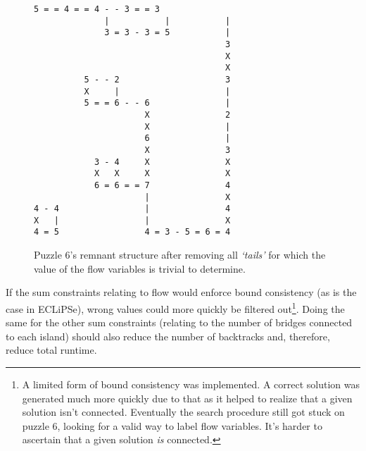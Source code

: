 \begin{figure}[H]
\centering
\begin{BVerbatim}[fontsize=\footnotesize]
              5 = = 4 = = 4 - - 3 = = 3
              |           |           |
              3 = 3 - 3 = 5           |
                                      3
                                      X
                                      X
          5 - - 2                     3
          X     |                     |
          5 = = 6 - - 6               |
                      X               2
                      X               |
                      6               |
                      X               3
            3 - 4     X               X
            X   X     X               X
            6 = 6 = = 7               4
                      |               X
4 - 4                 |               4
X   |                 |               X
4 = 5                 4 = 3 - 5 = 6 = 4
\end{BVerbatim}
\caption{Puzzle 6's remnant structure after removing all \textit{`tails'} for which the value of the flow variables is trivial to determine.}
\label{fig:circles}
\end{figure}

If the sum constraints relating to flow would enforce bound consistency (as is the case in ECLiPSe), wrong values could more quickly be filtered out\footnote{A limited form of bound consistency was implemented. A correct solution was generated much more quickly due to that as it helped to realize that a given solution isn't connected. Eventually the search procedure still got stuck on puzzle 6, looking for a valid way to label flow variables. It's harder to ascertain that a given solution \textit{is} connected.}. Doing the same for the other sum constraints (relating to the number of bridges connected to each island) should also reduce the number of backtracks and, therefore, reduce total runtime.